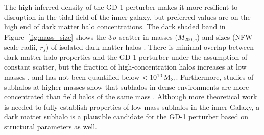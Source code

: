 \documentclass[twocolumn]{aastex62}
\newcommand{\acronym}[1]{{\small{#1}}}
\newcommand{\lcdm}{\acronym{$\Lambda$CDM}}
\begin{document}
The high inferred density of the GD-1 perturber makes it more resilient to disruption in the tidal field of the inner galaxy, but preferred values are on the high end of dark matter halo concentrations.
The dark shaded band in Figure~\ref{fig:mass_size} shows the $3\,\sigma$ scatter in masses ($M_{200,c}$) and sizes (NFW scale radii, $r_s$) of isolated dark matter halos \citep{diemer2018}.
There is minimal overlap between dark matter halo properties and the GD-1 perturber under the assumption of constant scatter, but the fraction of high-concentration halos increases at low masses \citep{diemer2015}, and has not been quantified below $<10^{10}\,\rm M_\odot$.
Furthermore, studies of subhalos at higher masses show that subhalos in dense environments are more concentrated than field halos of the same mass \citep[e.g.,][]{avilareese2005}.
Although more theoretical work is needed to fully establish properties of low-mass subhalos in the inner Galaxy, a dark matter subhalo is a plausible candidate for the GD-1 perturber based on structural parameters as well.



\end{document}
